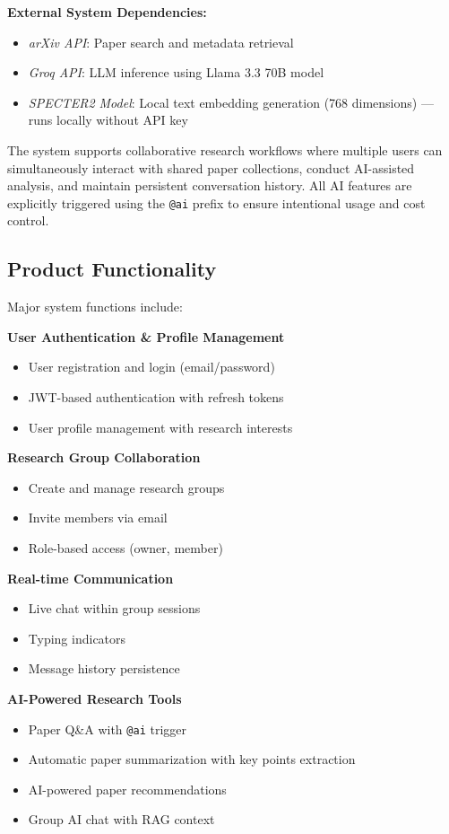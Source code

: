 \documentclass[11pt,a4paper]{article}
\begin{document}
\textbf{External System Dependencies:}
\begin{itemize}
    \item \textit{arXiv API}: Paper search and metadata retrieval
    \item \textit{Groq API}: LLM inference using Llama 3.3 70B model
    \item \textit{SPECTER2 Model}: Local text embedding generation (768 dimensions) --- runs locally without API key
\end{itemize}

The system supports collaborative research workflows where multiple users can simultaneously interact with shared paper collections, conduct AI-assisted analysis, and maintain persistent conversation history. All AI features are explicitly triggered using the \texttt{@ai} prefix to ensure intentional usage and cost control.

\subsection{Product Functionality}

Major system functions include:

\textbf{User Authentication \& Profile Management}
\begin{itemize}
    \item User registration and login (email/password)
    \item JWT-based authentication with refresh tokens
    \item User profile management with research interests
\end{itemize}

\textbf{Research Group Collaboration}
\begin{itemize}
    \item Create and manage research groups
    \item Invite members via email
    \item Role-based access (owner, member)
\end{itemize}

\textbf{Real-time Communication}
\begin{itemize}
    \item Live chat within group sessions
    \item Typing indicators
    \item Message history persistence
\end{itemize}

\textbf{AI-Powered Research Tools}
\begin{itemize}
    \item Paper Q\&A with \texttt{@ai} trigger
    \item Automatic paper summarization with key points extraction
    \item AI-powered paper recommendations
    \item Group AI chat with RAG context
\end{itemize}
\end{document}
